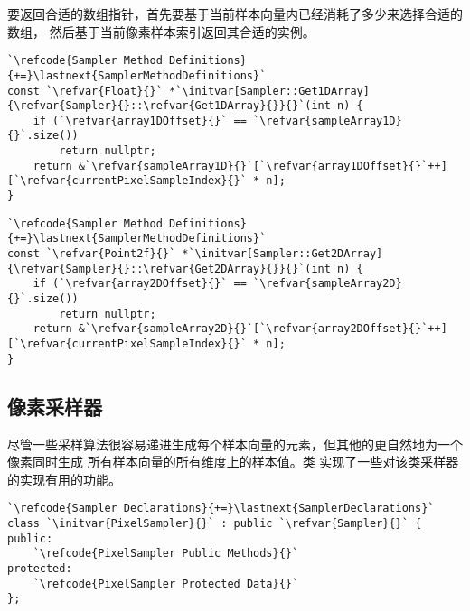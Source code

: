要返回合适的数组指针，首先要基于当前样本向量内已经消耗了多少来选择合适的数组，
然后基于当前像素样本索引返回其合适的实例。
\begin{lstlisting}
`\refcode{Sampler Method Definitions}{+=}\lastnext{SamplerMethodDefinitions}`
const `\refvar{Float}{}` *`\initvar[Sampler::Get1DArray]{\refvar{Sampler}{}::\refvar{Get1DArray}{}}{}`(int n) {
    if (`\refvar{array1DOffset}{}` == `\refvar{sampleArray1D}{}`.size())
        return nullptr;
    return &`\refvar{sampleArray1D}{}`[`\refvar{array1DOffset}{}`++][`\refvar{currentPixelSampleIndex}{}` * n];
}
\end{lstlisting}
\begin{lstlisting}
`\refcode{Sampler Method Definitions}{+=}\lastnext{SamplerMethodDefinitions}`
const `\refvar{Point2f}{}` *`\initvar[Sampler::Get2DArray]{\refvar{Sampler}{}::\refvar{Get2DArray}{}}{}`(int n) {
    if (`\refvar{array2DOffset}{}` == `\refvar{sampleArray2D}{}`.size())
        return nullptr;
    return &`\refvar{sampleArray2D}{}`[`\refvar{array2DOffset}{}`++][`\refvar{currentPixelSampleIndex}{}` * n];
}
\end{lstlisting}

\subsection{像素采样器}\label{sub:像素采样器}
尽管一些采样算法很容易递进生成每个样本向量的元素，但其他的更自然地为一个像素同时生成
所有样本向量的所有维度上的样本值。类
实现了一些对该类采样器的实现有用的功能。
\begin{lstlisting}
`\refcode{Sampler Declarations}{+=}\lastnext{SamplerDeclarations}`
class `\initvar{PixelSampler}{}` : public `\refvar{Sampler}{}` {
public:
    `\refcode{PixelSampler Public Methods}{}`
protected:
    `\refcode{PixelSampler Protected Data}{}`
};
\end{lstlisting}